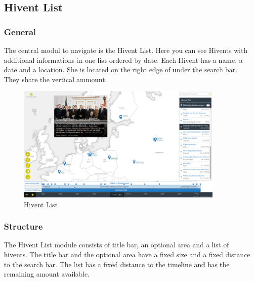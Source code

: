 \subsection{Hivent List} %
\label{sub:hivent_list}

\subsubsection{General} %
\label{ssub:general_hl}
The central modul to navigate \HG is the Hivent List. Here you can see Hivents with additional informations in one list ordered by date. Each Hivent has a name, a date and a location. She is located on the right edge of \HG under the search bar. They share the vertical ammount.

\begin{figure}[H]
  \centering
  \includegraphics[width=0.9\textwidth]{graphics/final_ui.png}
  \caption{Hivent List}
\end{figure}

\subsubsection{Structure} %
\label{ssub:structure_hl}
The Hivent List module consists of title bar, an optional area and a list of hivents. The title bar and the optional area have a fixed size and a fixed distance to the search bar. The list has a fixed distance to the timeline and has the remaining amount available.

